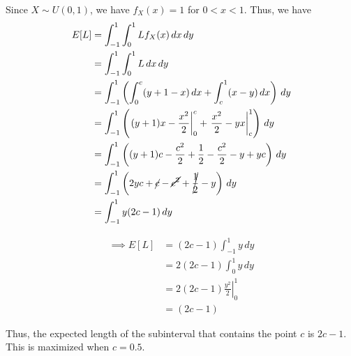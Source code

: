 Since \( X \sim U(0, 1) \), we have \( f_X(x) = 1 \) for \( 0 < x < 1 \).
Thus, we have
\begin{align*}
    E[L]
     & =
    \int_{-1}^{1} \int_{0}^{1} L f_X(x) \, dx \, dy
    \\ & =
    \int_{-1}^{1} \int_{0}^{1} L \, dx \, dy
    \\ & =
    \int_{-1}^{1}
    \left(
    \int_{0}^{c} (y+1-x) \, dx
    +
    \int_{c}^{1} (x-y) \, dx
    \right)
    \, dy
    \\ & =
    \int_{-1}^{1}
    \left(
    \left. (y+1)x - \frac{x^2}{2} \right|_{0}^{c}
    +
    \left. \frac{x^2}{2} - yx \right|_{c}^{1}
    \right)
    \, dy
    \\ & =
    \int_{-1}^{1}
    \left(
    (y+1)c - \frac{c^2}{2}
    +
    \frac{1}{2} - \frac{c^2}{2} - y + yc
    \right)
    \, dy
    \\ & =
    \int_{-1}^{1}
    \left(
    2yc + \cancel{c} - \cancel{c^2} + \cancel{\frac{1}{2}} - y
    \right)
    \, dy
    \\ & =
    \int_{-1}^{1}
    y(2c - 1)
    \, dy
\end{align*}

\begin{align*}
    \implies
    E[L]
     & =
    (2c - 1)
    \int_{-1}^{1}
    y
    \, dy
    \\ & =
    2(2c - 1)
    \int_{0}^{1}
    y
    \, dy
    \\ & =
    2(2c - 1)
    \left.
    \frac{y^2}{2}
    \right|_{0}^{1}
    \\ & =
    (2c - 1)
\end{align*}

Thus, the expected length of the subinterval that contains the point \( c \) is \( 2c - 1 \).
This is maximized when \( c = 0.5 \).

